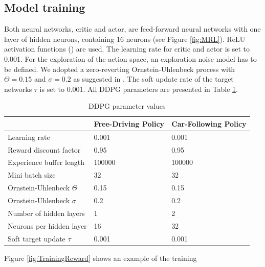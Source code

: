 \documentclass[review]{elsarticle}
\providecommand{\martinc}[1]{}                  %
\providecommand{\3}{{\ss}}
\begin{document}
\subsection{Model training}
Both neural networks, critic and actor, are feed-forward neural
networks with one layer of hidden neurons, containing 16 neurons (see
Figure \ref{fig:MRL}). ReLU activation functions (\cite{relu}) are used. The learning rate for
critic and actor is set to 0.001. \martinc{Ist das die Variable $\tau$
  in Algorithm~1? Bitte kl\"aren} For the exploration of the action
space, an exploration noise model has to be defined. We adopted a
zero-reverting Ornstein-Uhlenbeck process with $\Theta = 0.15$  and
$\sigma = 0.2$ as suggested in
\cite{DDPG}. \martinc{Einheitenbehaftet, also in $\unit[]{m/s^2}$ oder
  ist der action space skaliert gem\"a\3 der 2. Komponente des State
  Vektors?} The soft update rate of the target networks $\tau$ is set to
0.001.\martinc{Och, noch eine Tiefpass-Zeitvariable der Gr\"o\3e
  0.001. Welche von den beiden ist $\tau$?}
All DDPG parameters are presented in Table \ref{tab:DDPGparameters}.
%
  \begin{table}
	\caption{DDPG parameter values} 
	\label{tab:DDPGparameters} 
	\begin{center}
		\begin{tabular}{ p{} p{}  p{} }
			 & Free-Driving Policy & Car-Following Policy \\ \hline
			Learning rate & 0.001 & 0.001\\ 
			Reward discount factor & 0.95 & 0.95 \\ 
			Experience buffer length & 100000 & 100000 \\ 
			Mini batch size & 32 & 32 \\ 			
			Ornstein-Uhlenbeck  $\Theta$ & 0.15& 0.15 \\ 
			Ornstein-Uhlenbeck  $\sigma$ & 0.2 & 0.2 \\ 
			Number of hidden layers & 1 & 2\\
			Neurons per hidden layer & 16 & 32\\
			Soft target update  $\tau$ & 0.001 & 0.001\\
			
			
		\end{tabular}
	\end{center}
\end{table}
%
\martinc{Evtl. diese Abb vorziehen. Manche Journals wollen Bilder in
  der Reihenfolge der ersten Erwaehnung im Haupttext}
Figure \ref{fig:TrainingReward} shows an example of the training
\end{document}

